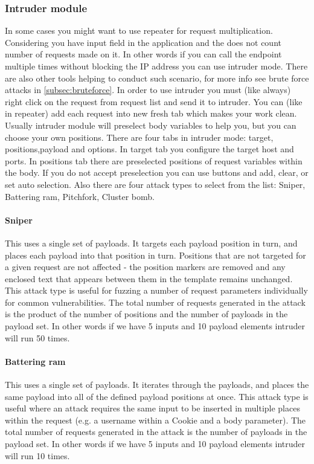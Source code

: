 \documentclass{article}[12pt]
\begin{document}
\subsubsection{Intruder module}

In some cases you might want to use repeater for request multiplication.
Considering you have input field in the application and the does not count number of requests made on it.
In other words if you can call the endpoint multiple times without blocking the IP address you can use intruder mode.
There are also other tools helping to conduct such scenario, for more info see brute force attacks in \ref{subsec:bruteforce}.\newline \newline
In order to use intruder you must (like always) right click on the request from request list and send it to intruder.
You can (like in repeater) add each request into new fresh tab which makes your work clean.
Usually intruder module will preselect body variables to help you, but you can choose your own positions.
There are four tabs in intruder mode: target, positions,payload and options.
In target tab you configure the target host and ports.
In positions tab there are preselected positions of request variables within the body.
If you do not accept preselection you can use buttons and add, clear, or set auto selection.
Also there are four attack types to select from the list: Sniper, Battering ram, Pitchfork, Cluster bomb.

\paragraph{Sniper}
This uses a single set of payloads.
It targets each payload position in turn, and places each payload into that position in turn.
Positions that are not targeted for a given request are not affected - the position markers are removed and any enclosed text that appears between them in the template remains unchanged.
This attack type is useful for fuzzing a number of request parameters individually for common vulnerabilities.
The total number of requests generated in the attack is the product of the number of positions and the number of payloads in the payload set.
In other words if we have 5 inputs and 10 payload elements intruder will run 50 times.
\paragraph{Battering ram}
This uses a single set of payloads.
It iterates through the payloads, and places the same payload into all of the defined payload positions at once.
This attack type is useful where an attack requires the same input to be inserted in multiple places within the request (e.g. a username within a Cookie and a body parameter).
The total number of requests generated in the attack is the number of payloads in the payload set.
In other words if we have 5 inputs and 10 payload elements intruder will run 10 times.
\end{document}
